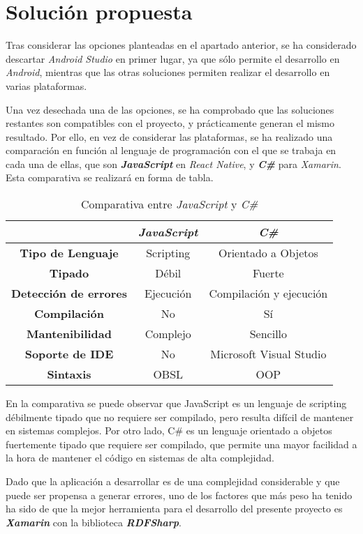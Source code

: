 
\section{Solución propuesta}
Tras considerar las opciones planteadas en el apartado anterior, se ha considerado descartar \textit{Android Studio} en 
primer lugar, ya que sólo permite el desarrollo en \textit{Android}, mientras que las otras soluciones permiten realizar 
el desarrollo en varias plataformas. \medskip

Una vez desechada una de las opciones, se ha comprobado que las soluciones restantes son compatibles con el proyecto, y 
prácticamente generan el mismo resultado. Por ello, en vez de considerar las plataformas, se ha realizado una comparación 
en función al lenguaje de programación con el que se trabaja en cada una de ellas, que son \textit{\textbf{JavaScript}} en 
\textit{React Native}, y \textit{\textbf{C\#}} para \textit{Xamarin}. Esta comparativa se realizará en forma de tabla.\bigskip

\begin{table}[htb]
\centering
\caption{Comparativa entre \textit{JavaScript} y \textit{C\#}}
\bigskip
\begin{tabular}{|c|c|c|}
    \hline
    & \textit{\textbf{JavaScript}} & \textbf{\textit{C\#}} \\ \hline \hline
    \textbf{Tipo de Lenguaje} & Scripting & Orientado a Objetos \\ \hline
    \textbf{Tipado} & Débil & Fuerte \\ \hline
    \textbf{Detección de errores} & Ejecución & Compilación y ejecución \\ \hline
    \textbf{Compilación} & No & Sí \\ \hline
    \textbf{Mantenibilidad} & Complejo & Sencillo \\ \hline
    \textbf{Soporte de IDE} & No & Microsoft Visual Studio \\ \hline
    \textbf{Sintaxis} & OBSL & OOP \\ \hline
\end{tabular}
\end{table}  

En la comparativa se puede observar que JavaScript es un lenguaje de scripting débilmente tipado que 
no requiere ser compilado, pero resulta difícil de mantener en sistemas complejos. Por otro lado, 
C\# es un lenguaje orientado a objetos fuertemente tipado que requiere ser compilado, que permite 
una mayor facilidad a la hora de mantener el código en sistemas de alta complejidad.

Dado que la aplicación a desarrollar es de una complejidad considerable y que puede ser propensa 
a generar errores, uno de los factores que más peso ha tenido ha sido 
de que la mejor herramienta para el desarrollo del presente proyecto es \textit{\textbf{Xamarin}} con 
la biblioteca \textit{\textbf{RDFSharp}}.